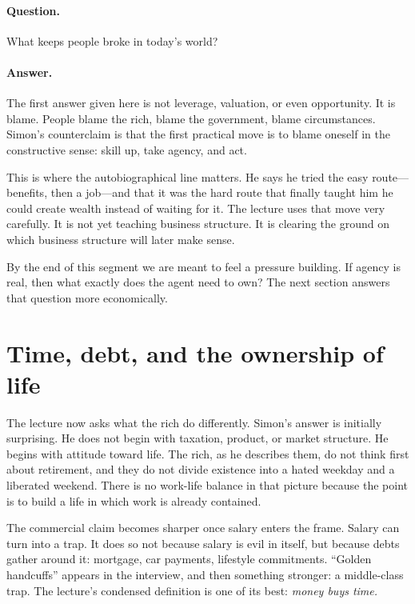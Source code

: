 \paragraph{Question.} What keeps people broke in today's world?

\paragraph{Answer.} The first answer given here is not leverage, valuation, or even opportunity. It is blame. People blame the rich, blame the government, blame circumstances. Simon's counterclaim is that the first practical move is to blame oneself in the constructive sense: skill up, take agency, and act.

This is where the autobiographical line matters. He says he tried the easy route---benefits, then a job---and that it was the hard route that finally taught him he could create wealth instead of waiting for it. The lecture uses that move very carefully. It is not yet teaching business structure. It is clearing the ground on which business structure will later make sense.

By the end of this segment we are meant to feel a pressure building. If agency is real, then what exactly does the agent need to own? The next section answers that question more economically.

\section{Time, debt, and the ownership of life}

The lecture now asks what the rich do differently. Simon's answer is initially surprising. He does not begin with taxation, product, or market structure. He begins with attitude toward life. The rich, as he describes them, do not think first about retirement, and they do not divide existence into a hated weekday and a liberated weekend. There is no work-life balance in that picture because the point is to build a life in which work is already contained.

The commercial claim becomes sharper once salary enters the frame. Salary can turn into a trap. It does so not because salary is evil in itself, but because debts gather around it: mortgage, car payments, lifestyle commitments. ``Golden handcuffs'' appears in the interview, and then something stronger: a middle-class trap. The lecture's condensed definition is one of its best:
\textit{money buys time.}

